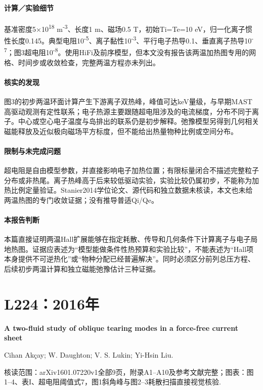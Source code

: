 \documentclass[UTF8,a4paper,11pt,openany,fontset=fandol]{ctexbook}
\begin{document}
\paragraph{计算／实验细节}基准密度5×10\textsuperscript{18} m\textsuperscript{-3}、长度1 m、磁场0.5 T，初始Ti=Te=10 eV，归一化离子惯性长度0.145。典型电阻10\textsuperscript{-5}、离子黏性10\textsuperscript{-3}、平行电子热导0.1、垂直离子热导10\textsuperscript{-7}；图3超电阻10\textsuperscript{-8}。使用HiFi及前序模型，但本文没有报告该两温加热图专用的网格、时间步或收敛检查，完整两温方程亦未列出。

\paragraph{核实的发现}图3的初步两温环面计算产生下游离子双热峰，峰值可达keV量级，与早期MAST高驱动观测有定性联系；电子热源主要跟随超电阻涉及的电流梯度，分布不同于离子。中心或空心电子温度与岛排出的联系仍是初步解释。弛豫模型另得到几何相关磁能释放及近似极向磁场平方标度，但不能给出热量物种比例或空间分布。

\paragraph{限制与未完成问题}超电阻是自由模型参数，并直接影响电子加热位置；有限标量闭合不描述完整粒子分布或非热尾。离子热峰高于后来较低驱动实验，实验比较仍属初步，不能称为加热比例定量验证。Stanier2014学位论文、源代码和独立数据未核读，本文也未给两温热图的专门收敛证据；没有推导普适Qi/Qe。

\paragraph{本报告判断}本篇直接证明两温Hall扩展能够在指定耗散、传导和几何条件下计算离子与电子局地热图。证据应表述为“模型能做条件性热预算和实验比较”，不能表述为“Hall项本身提供不可逆热化”或“物种分配已经普遍解决”。同时必须区分前列总压方程、后续初步两温计算和独立磁能弛豫估计三种证据。

\section{L224：2016年}\label{paper:L224}

\textbf{A two-fluid study of oblique tearing modes in a force-free current sheet}\citep{L224}\

Cihan Akçay;  W. Daughton;  V. S. Lukin;  Yi-Hsin Liu.

\textsf{核读范围：}arXiv1601.07220v1全部9页，附录A1–A10及参考文献完整；\textsf{图表：}图1–4、表I、超电阻阈值式7，图1斜角峰与图2–3耗散扫描直接视觉核验.
\end{document}
